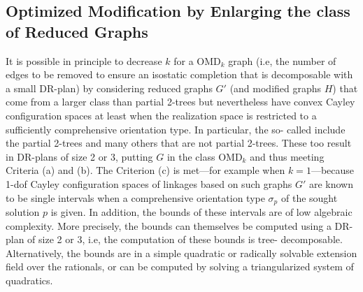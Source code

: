 \subsection{Optimized Modification by Enlarging the class of Reduced
Graphs}
\label{sec:tdecomp}
%
It is possible in principle to decrease $k$ for a OMD$_k$ graph (i.e,
the number of edges to be removed to ensure an isostatic completion
that is decomposable with a small DR-plan) by considering reduced
graphs $G'$ (and modified graphs $H$) that come from a larger class
than partial 2-trees but nevertheless have convex Cayley configuration
spaces at least when the realization space is restricted to a
sufficiently comprehensive orientation type. In particular, the so-
called 
\cite{sitharam2011cayleyI,sitharam2011cayleyII} include the partial 2-trees and many others that are not
partial 2-trees. These too result in DR-plans of size 2 or 3, putting
$G$ in the class OMD$_k$ and thus meeting Criteria (a) and (b). The
Criterion (c) is met---for example when $k=1$---because 1-dof Cayley
configuration spaces of linkages based on such graphs $G'$ are known
to be single intervals when a comprehensive orientation type
$\sigma_p$ of the sought solution $p$ is given. In addition, the
bounds of these intervals are of low algebraic complexity. More
precisely, the bounds  can themselves be computed using a DR-plan of
size 2 or 3, i.e, the computation of these bounds is tree-
decomposable. Alternatively, the bounds are in a simple quadratic or
radically solvable extension field over the rationals, or can be
computed by solving a triangularized system of quadratics.
